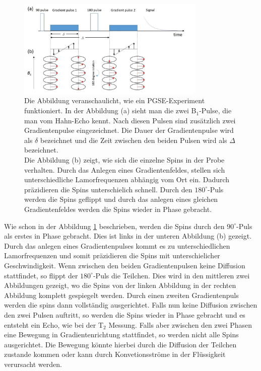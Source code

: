 \begin{figure}[H]
    \centering
    \includegraphics[width=0.8\textwidth]{Abbildungen/PGSE.JPG}
    \caption{Die Abbildung veranschaulicht, wie ein PGSE-Experiment funktioniert. In der Abbildung (a) sieht man die zwei B$_1$-Pulse, die man vom Hahn-Echo kennt. Nach diesen Pulsen sind zusätzlich zwei Gradientenpulse eingezeichnet. Die Dauer der Gradientenpulse wird als $\delta$ bezeichnet und die Zeit zwischen den beiden Pulsen wird als $\Delta$ bezeichnet.\\
    Die Abbildung (b) zeigt, wie sich die einzelne Spins in der Probe verhalten. Durch das Anlegen eines Gradientenfeldes, stellen sich unterschiedliche Lamorfrequenzen abhängig vom Ort ein. Dadurch präzidieren die Spins unterschielich schnell. Durch den $180^{\circ}$-Puls werden die Spins geflippt und durch das anlegen eines gleichen Gradientenfeldes werden die Spins wieder in Phase gebracht.   
    \cite{literaturPGSE}}
    \label{fig:PGSE}
\end{figure}
Wie schon in der Abbildung \ref{fig:PGSE} beschrieben, werden die Spins durch den $90^{\circ}$-Puls als erstes in Phase gebracht. Dies ist links in der unteren Abbildung (b) gezeigt. Durch das anlegen eines Gradientenpulses kommt es zu unterschiedlichen Lamorfrequenzen und somit präzidieren die Spins mit unterschielicher Geschwindigkeit.
Wenn zwischen den beiden Gradientenpulsen keine Diffusion stattfindet, so flippt der $180^{\circ}$-Puls die Teilchen. Dies wird in den mittleren zwei Abbildungen gezeigt, wo die Spins von der linken Abbildung in der rechten Abbildung komplett gespiegelt werden. Durch einen zweiten Gradientenpuls werden die spins dann vollständig ausgerichtet. Falls nun keine Diffusion zwischen den zwei Pulsen auftritt, so werden die Spins wieder in Phase gebracht und es entsteht ein Echo,
 wie bei der T$_2$ Messung.
Falls aber zwischen den zwei Phasen eine Bewegung in Gradientenrichtung stattfindet,
so werden nicht alle Spins ausgerichtet. 
Die Bewegung könnte hierbei durch die Diffusion der Teilchen zustande kommen oder kann durch Konvetionsströme in der Flüssigkeit verursacht werden.
